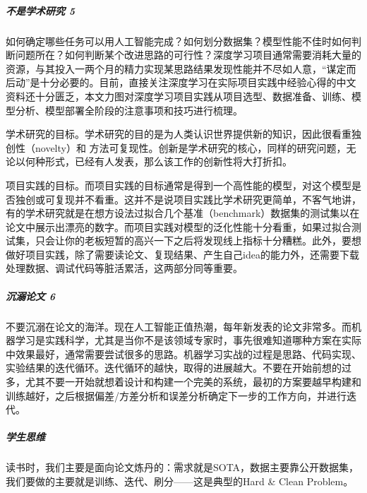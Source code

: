 \documentclass[letterpaper,11pt,english]{sphinxmanual}
\begin{document}
\subparagraph{不是学术研究 5\sphinxfootnotemark[97]}
\label{\detokenize{chapter_introduction/AI_PM:id23}}%
\begin{footnotetext}[97]\sphinxAtStartFootnote
{}
%
\end{footnotetext}\ignorespaces 
如何确定哪些任务可以用人工智能完成？如何划分数据集？模型性能不佳时如何判断问题所在？如何判断某个改进思路的可行性？深度学习项目通常需要消耗大量的资源，与其投入一两个月的精力实现某思路结果发现性能并不尽如人意，“谋定而后动”是十分必要的。目前，直接关注深度学习在实际项目实践中经验心得的中文资料还十分匮乏，本文力图对深度学习项目实践从项目选型、数据准备、训练、模型分析、模型部署全阶段的注意事项和技巧进行梳理。

学术研究的目标。学术研究的目的是为人类认识世界提供新的知识，因此很看重独创性（novelty）和
方法可复现性。创新是学术研究的核心，同样的研究问题，无论以何种形式，已经有人发表，那么该工作的创新性将大打折扣。

项目实践的目标。而项目实践的目标通常是得到一个高性能的模型，对这个模型是否独创或可复现并不看重。这并不是说项目实践比学术研究更简单，不客气地讲，有的学术研究就是在想方设法过拟合几个基准（benchmark）数据集的测试集以在论文中展示出漂亮的数字。而项目实践对模型的泛化性能十分看重，如果过拟合测试集，只会让你的老板短暂的高兴一下之后将发现线上指标十分糟糕。此外，要想做好项目实践，除了需要读论文、复现结果、产生自己idea的能力外，还需要下载处理数据、调试代码等脏活累活，这两部分同等重要。


\subparagraph{沉溺论文 6\sphinxfootnotemark[98]}
\label{\detokenize{chapter_introduction/AI_PM:id24}}%
\begin{footnotetext}[98]\sphinxAtStartFootnote
{}
%
\end{footnotetext}\ignorespaces 
不要沉溺在论文的海洋。现在人工智能正值热潮，每年新发表的论文非常多。而机器学习是实践科学，尤其是当你不是该领域专家时，事先很难知道哪种方案在实际中效果最好，通常需要尝试很多的思路。机器学习实战的过程是思路、代码实现、实验结果的迭代循环。迭代循环的越快，取得的进展越大。不要在开始前想的过多，尤其不要一开始就想着设计和构建一个完美的系统，最初的方案要越早构建和训练越好，之后根据偏差/方差分析和误差分析确定下一步的工作方向，并进行迭代。


\subparagraph{学生思维}
\label{\detokenize{chapter_introduction/AI_PM:id25}}
读书时，我们主要是面向论文炼丹的：需求就是SOTA，数据主要靠公开数据集，我们要做的主要就是训练、迭代、刷分——这是典型的Hard
\& Clean Problem。
\end{document}
